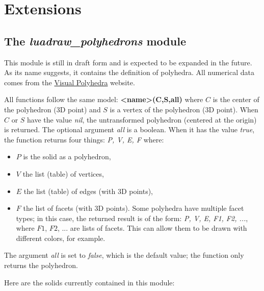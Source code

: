 \section{Extensions}

\subsection{The \emph{luadraw\_polyhedrons} module}

This module is still in draft form and is expected to be expanded in the future. As its name suggests, it contains the definition of polyhedra. All numerical data comes from the \href{https://dmccooey.com/polyhedra/}{Visual Polyhedra} website.

All functions follow the same model: \textbf{<name>(C,S,all)} where $C$ is the center of the polyhedron (3D point) and $S$ is a vertex of the polyhedron (3D point). When $C$ or $S$ have the value \emph{nil}, the untransformed polyhedron (centered at the origin) is returned. The optional argument \emph{all} is a boolean. When it has the value \emph{true}, the function returns four things: \emph{P, V, E, F} where:
\begin{itemize}
    \item $P$ is the solid as a polyhedron,
    \item $V$ the list (table) of vertices,
    \item $E$ the list (table) of edges (with 3D points),
    \item $F$ the list of facets (with 3D points). Some polyhedra have multiple facet types; in this case, the returned result is of the form: \emph{P, V, E, F1, F2, ...}, where $F1$, $F2$, ... are lists of facets. This can allow them to be drawn with different colors, for example. \end{itemize}
The argument \emph{all} is set to \emph{false}, which is the default value; the function only returns the polyhedron.

Here are the solids currently contained in this module:

